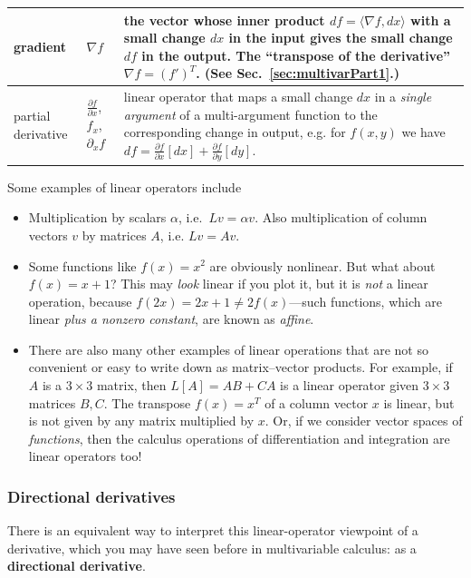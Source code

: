 \begin{notation}
\begin{tabular}{| m{2.1cm} | m{5cm}| m{7cm} |}
\hline
gradient & $\boxed{\nabla f}$ & the vector whose inner product $df = \langle \nabla f, dx \rangle$ with a small change $dx$ in the input gives the small change $df$ in the output.  The ``transpose of the derivative'' $\nabla f = (f')^T$.  (See Sec.~\ref{sec:multivarPart1}.)
\tabularnewline
\hline
partial derivative & $\boxed{\frac{\partial f}{\partial x}}$, $f_{x}$, $\partial_{x}f$ & linear operator that maps a small change $dx$ in a \emph{single argument}
of a multi-argument function to the corresponding change in output,
e.g. for $f(x,y)$ we have $df=\frac{\partial f}{\partial x}[dx]+\frac{\partial f}{\partial y}[dy]$.\tabularnewline
\hline
\end{tabular}
\end{notation}

\newpage

Some examples of linear operators include
\begin{itemize}
    \item Multiplication by scalars $\alpha$, i.e.~$Lv = \alpha v$.  Also  multiplication of column vectors $v$ by matrices $A$, i.e. $Lv = Av$.
    \item Some functions like $f(x)=x^2$ are obviously nonlinear.  But what about $f(x)=x+1$?  This may \emph{look} linear if you plot it, but it is \emph{not} a linear operation, because $f(2x)=2x+1\ne 2f(x)$---such functions, which are linear \emph{plus a nonzero constant}, are known as \emph{affine}.
    \item There are also many other examples of linear operations that are not so convenient or easy to write down as matrix--vector products.  For example, if $A$ is a $3\times 3$ matrix, then $L[A]=AB+CA$ is a linear operator given $3\times 3$ matrices $B,C$.  The transpose $f(x)=x^T$ of a column vector $x$ is linear, but is not given by any matrix multiplied by $x$. Or, if we consider vector spaces of \emph{functions}, then the calculus operations of differentiation and integration are linear operators too!
\end{itemize}

\subsubsection{Directional derivatives}
\label{sec:directional}

There is an equivalent way to interpret this linear-operator viewpoint of a derivative, which you may have seen before in multivariable calculus: as a \textbf{directional derivative}.

